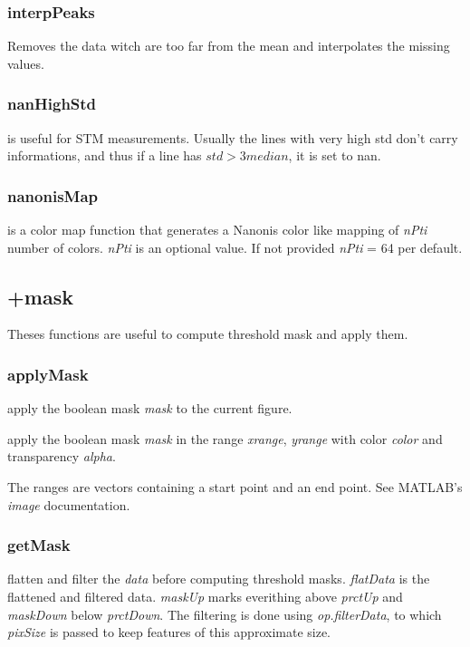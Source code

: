 \subsubsection{interpPeaks}
\bdf
{} Removes the data witch are too far from the mean and interpolates the missing values.
\edf
\subsubsection{nanHighStd}
\bdf
{} is useful for STM measurements. Usually the lines with very high std don't carry informations, and thus if a line has $std > 3 median$, it is set to nan.
\edf
\subsubsection{nanonisMap}
\bdf
{} is a color map function that generates a Nanonis color like mapping of \emph{nPti} number of colors. \emph{nPti} is an optional value. If not provided \emph{nPti} = 64 per default. 
\edf

\subsection{+mask}
Theses functions are useful to compute threshold mask and apply them.
\subsubsection{applyMask}
\bdf
{} apply the boolean mask \emph{mask} to the current figure.

 apply the boolean mask \emph{mask} in the range \emph{xrange}, \emph{yrange} with color \emph{color} and transparency \emph{alpha}. 
\edf

The ranges are vectors containing a start point and an end point. See MATLAB's \emph{image} documentation.
\subsubsection{getMask}
\bdf
{}
 flatten and filter the \emph{data} before computing threshold masks. \emph{flatData} is the flattened and filtered data. \emph{maskUp} marks everithing above \emph{prctUp} and \emph{maskDown} below \emph{prctDown}. The filtering is done using \emph{op.filterData}, to which \emph{pixSize} is passed to keep features of this approximate size.

